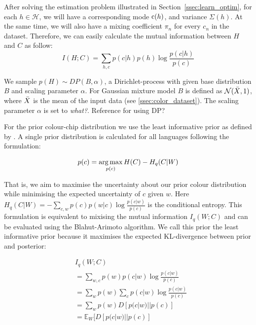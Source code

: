 \documentclass[11pt]{article}
\begin{document}
After solving the estimation problem illustrated in Section~\ref{ssec:learn_optim}, for each $h\in\mathcal{H}$, we will have a corresponding mode ${\textnormal{c}}(h)$, and variance $\Sigma(h)$. 
At the same time, we will also have a mixing coefficient $\pi_n$ for every $c_n$ in the dataset.
Therefore, we can easily calculate the mutual information between $H$ and $C$ as follow:
\begin{equation}
    I(H;C) = \sum_{h,c} p(c|h)p(h)\log\frac{p(c|h)}{p(c)}
\end{equation}


We sample $p(H) \sim DP(B, \alpha)$, a Dirichlet-process with given base distribution $B$ and scaling parameter $\alpha$. For Gaussian mixture model $B$ is defined as $\mathcal{N}(\Bar{X},1)$, where $\Bar{X}$ is the mean of the input data (see \ref{ssec:color_dataset}). The scaling parameter $\alpha$ is set to \textit{what?}. Reference for using DP?

For the prior colour-chip distribution we use the least informative prior as defined by \cite{zaslavsky2018efficient}. A single prior distribution is calculated for all languages following the formulation:

\[p(c)=\operatorname*{arg\,max}_{p(c)} H(C)-H_q(C|W)\]

That is, we aim to maximise the uncertainty about our prior colour distribution while minimising the expected uncertainty of $c$ given $w$. Here $H_q(C|W)=-\sum_{c,w} p(c)p(w|c)\log \frac{p(c|w)}{p(c)}$ is the conditional entropy. This formulation is equivalent to mixising the mutual information $I_q(W;C)$ and can be evaluated using the Blahut-Arimoto algorithm. We call this prior the least informative prior because it maximises the expected KL-divergence between prior and posterior:

\begin{align*}
        & I_q(W;C)\\
        &  = \sum_{w,c} p(w)p(c|w)\log \frac{p(c|w)}{p(c)} \\
        &  = \sum_{w} p(w) \sum_c p(c|w)\log \frac{p(c|w)}{p(c)} \\
        &  = \sum_{w} p(w) D[p(c|w)||p(c)] \\
        & = \mathbb{E}_{W}[D[p(c|w)||p(c)]
    \label{eq:least_informative_prior}
\end{align*}
\end{document}
